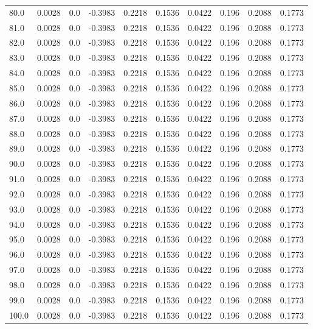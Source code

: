 \begin{longtable}{lrrrrrrrrr}
80.0 & 0.0028 & 0.0 & -0.3983 & 0.2218 & 0.1536 & 0.0422 & 0.196 & 0.2088 & 0.1773 \\
81.0 & 0.0028 & 0.0 & -0.3983 & 0.2218 & 0.1536 & 0.0422 & 0.196 & 0.2088 & 0.1773 \\
82.0 & 0.0028 & 0.0 & -0.3983 & 0.2218 & 0.1536 & 0.0422 & 0.196 & 0.2088 & 0.1773 \\
83.0 & 0.0028 & 0.0 & -0.3983 & 0.2218 & 0.1536 & 0.0422 & 0.196 & 0.2088 & 0.1773 \\
84.0 & 0.0028 & 0.0 & -0.3983 & 0.2218 & 0.1536 & 0.0422 & 0.196 & 0.2088 & 0.1773 \\
85.0 & 0.0028 & 0.0 & -0.3983 & 0.2218 & 0.1536 & 0.0422 & 0.196 & 0.2088 & 0.1773 \\
86.0 & 0.0028 & 0.0 & -0.3983 & 0.2218 & 0.1536 & 0.0422 & 0.196 & 0.2088 & 0.1773 \\
87.0 & 0.0028 & 0.0 & -0.3983 & 0.2218 & 0.1536 & 0.0422 & 0.196 & 0.2088 & 0.1773 \\
88.0 & 0.0028 & 0.0 & -0.3983 & 0.2218 & 0.1536 & 0.0422 & 0.196 & 0.2088 & 0.1773 \\
89.0 & 0.0028 & 0.0 & -0.3983 & 0.2218 & 0.1536 & 0.0422 & 0.196 & 0.2088 & 0.1773 \\
90.0 & 0.0028 & 0.0 & -0.3983 & 0.2218 & 0.1536 & 0.0422 & 0.196 & 0.2088 & 0.1773 \\
91.0 & 0.0028 & 0.0 & -0.3983 & 0.2218 & 0.1536 & 0.0422 & 0.196 & 0.2088 & 0.1773 \\
92.0 & 0.0028 & 0.0 & -0.3983 & 0.2218 & 0.1536 & 0.0422 & 0.196 & 0.2088 & 0.1773 \\
93.0 & 0.0028 & 0.0 & -0.3983 & 0.2218 & 0.1536 & 0.0422 & 0.196 & 0.2088 & 0.1773 \\
94.0 & 0.0028 & 0.0 & -0.3983 & 0.2218 & 0.1536 & 0.0422 & 0.196 & 0.2088 & 0.1773 \\
95.0 & 0.0028 & 0.0 & -0.3983 & 0.2218 & 0.1536 & 0.0422 & 0.196 & 0.2088 & 0.1773 \\
96.0 & 0.0028 & 0.0 & -0.3983 & 0.2218 & 0.1536 & 0.0422 & 0.196 & 0.2088 & 0.1773 \\
97.0 & 0.0028 & 0.0 & -0.3983 & 0.2218 & 0.1536 & 0.0422 & 0.196 & 0.2088 & 0.1773 \\
98.0 & 0.0028 & 0.0 & -0.3983 & 0.2218 & 0.1536 & 0.0422 & 0.196 & 0.2088 & 0.1773 \\
99.0 & 0.0028 & 0.0 & -0.3983 & 0.2218 & 0.1536 & 0.0422 & 0.196 & 0.2088 & 0.1773 \\
100.0 & 0.0028 & 0.0 & -0.3983 & 0.2218 & 0.1536 & 0.0422 & 0.196 & 0.2088 & 0.1773 \\

\end{longtable}

